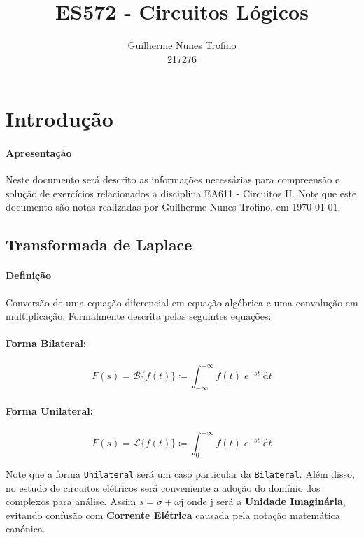 \documentclass{article}
\title{ES572 - Circuitos Lógicos}
\author{Guilherme Nunes Trofino\\217276}
\newcommand{\nameSubject}{EA611 - Circuitos II}
\newcommand{\nameAuthor}{Guilherme Nunes Trofino}
\begin{document}
    \maketitle
\newpage

    \tableofcontents
\newpage


    \section{Introdução}
        \paragraph{Apresentação}Neste documento será descrito as informações necessárias para compreensão e solução de exercícios relacionados a disciplina \nameSubject. Note que este documento são notas realizadas por \nameAuthor, em \today.

        \subsection{Transformada de Laplace}
            \paragraph{Definição}Conversão de uma equação diferencial em equação algébrica e uma convolução em multiplicação. Formalmente descrita pelas seguintes equações:

            \begin{multicols}{2}
                \raggedcolumns
                \paragraph{Forma Bilateral:}
                    \begin{equation}
                        \boxed{
                            F(s) = \mathcal{B}\{ f(t) \} \coloneqq \int_{-\infty}^{+\infty} f(t) \; e^{-st} \; \text{d} t
                        }
                    \end{equation}

                \columnbreak

                \paragraph{Forma Unilateral:}
                    \begin{equation}
                        \boxed{
                            F(s) = \mathcal{L}\{ f(t) \} \coloneqq \int_{0}^{+\infty} f(t) \; e^{-st} \; \text{d} t
                        }
                    \end{equation}
            \end{multicols}\noindent
            Note que a forma \texttt{Unilateral} será um caso particular da \texttt{Bilateral}. Além disso, no estudo de circuitos elétricos será conveniente a adoção do domínio dos complexos para análise. Assim $s = \sigma + \omega\text{j}$ onde $\text{j}$ será a \textbf{Unidade Imaginária}, evitando confusão com \textbf{Corrente Elétrica} causada pela notação matemática canónica.
\end{document}
